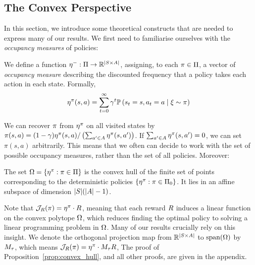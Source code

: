 \subsection{The Convex Perspective}\label{subsec:convex-perspective}

In this section, we introduce some theoretical constructs that are needed to express many of our results. We first need to familiarise ourselves with the \emph{occupancy measures} of policies:

\begin{definition}\label{def:measure}
    We define a function $\mathbf{\eta^{-}} : \Pi \to \mathbb{R}^{|{S{\times}A}|}$, assigning, to each $\pi \in \Pi$, a vector of \emph{occupancy measure} describing the discounted frequency that a policy takes each action in each state. Formally,
    \[
        \mathbf{\eta^{\pi}}(s,a) = \sum_{t = 0}^{\infty} \gamma^t \mathbb{P}\left({s_t = s, a_t = a \mid \xi \sim \pi}\right)
    \]
\end{definition}
We can recover $\pi$ from $\mathbf{\eta^{\pi}}$ on all visited states by $\pi(s, a) = (1 - \gamma)\mathbf{\eta^{\pi}}(s,a)/\left(\sum_{a' \in A} \mathbf{\eta^{\pi}}(s, a')\right)$. If $\sum_{a' \in A} \mathbf{\eta^{\pi}}(s, a') = 0$, we can set $\pi(s, a)$ arbitrarily.
This means that we often can decide to work with the set of possible occupancy measures, rather than the set of all policies.
Moreover:


\begin{proposition}\label{prop:convex_hull}
The set $\Omega = \{\mathbf{\eta^{\pi}}: \pi \in \Pi\}$ is the convex hull of the finite set of points corresponding to the deterministic policies $\{\mathbf{\eta^{\pi}}: \pi \in \Pi_0\}$. It lies in an affine subspace of dimension $|S|(|A| - 1)$.
\end{proposition}

Note that $\mathcal{J}_R(\pi) = \mathbf{\eta^{\pi}} \cdot R$, meaning that each reward $R$ induces a linear function on the convex polytope $\Omega$, which reduces finding the optimal policy to solving a linear programming problem in $\Omega$. Many of our results crucially rely on this insight.
We denote the orthogonal projection map from $\mathbb{R}^{|{S{\times}A}|}$ to $\textrm{span}(\Omega)$ by $M_\tau$, which means $\mathcal{J}_R(\pi) = \mathbf{\eta^{\pi}} \cdot M_\tau R$, The proof of Proposition~\ref{prop:convex_hull}, and all other proofs, are given in the appendix.
